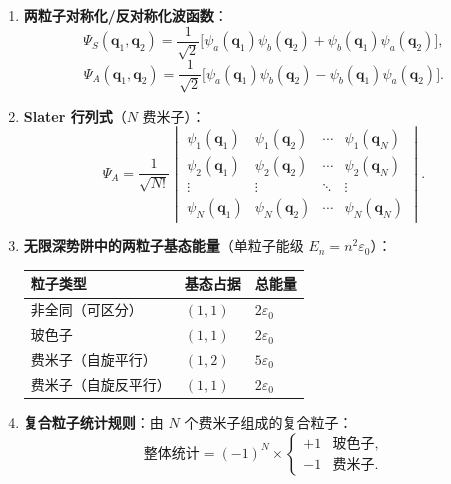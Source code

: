 \begin{formulabox}[核心公式]
\begin{enumerate}[label=\textbf{(\arabic*)}]
    \item \textbf{两粒子对称化/反对称化波函数}：
    \[
    \Psi_S(\mathbf{q}_1,\mathbf{q}_2)=\frac{1}{\sqrt{2}}\bigl[\psi_a(\mathbf{q}_1)\psi_b(\mathbf{q}_2)+\psi_b(\mathbf{q}_1)\psi_a(\mathbf{q}_2)\bigr],
    \]
    \[
    \Psi_A(\mathbf{q}_1,\mathbf{q}_2)=\frac{1}{\sqrt{2}}\bigl[\psi_a(\mathbf{q}_1)\psi_b(\mathbf{q}_2)-\psi_b(\mathbf{q}_1)\psi_a(\mathbf{q}_2)\bigr].
    \]

    \item \textbf{Slater 行列式}（$N$ 费米子）：
    \[
    \Psi_A=\frac{1}{\sqrt{N!}}
    \begin{vmatrix}
    \psi_1(\mathbf{q}_1)&\psi_1(\mathbf{q}_2)&\cdots&\psi_1(\mathbf{q}_N)\\
    \psi_2(\mathbf{q}_1)&\psi_2(\mathbf{q}_2)&\cdots&\psi_2(\mathbf{q}_N)\\
    \vdots&\vdots&\ddots&\vdots\\
    \psi_N(\mathbf{q}_1)&\psi_N(\mathbf{q}_2)&\cdots&\psi_N(\mathbf{q}_N)
    \end{vmatrix}.
    \]

    \item \textbf{无限深势阱中的两粒子基态能量}（单粒子能级 $E_n=n^2\varepsilon_0$）：
    \begin{center}
    \begin{tabular}{lll}
    \toprule
    \textbf{粒子类型} & \textbf{基态占据} & \textbf{总能量} \\
    \midrule
    非全同（可区分） & $(1,1)$ & $2\varepsilon_0$ \\
    玻色子 & $(1,1)$ & $2\varepsilon_0$ \\
    费米子（自旋平行） & $(1,2)$ & $5\varepsilon_0$ \\
    费米子（自旋反平行） & $(1,1)$ & $2\varepsilon_0$ \\
    \bottomrule
    \end{tabular}
    \end{center}

    \item \textbf{复合粒子统计规则}：由 $N$ 个费米子组成的复合粒子：
    \[
    \text{整体统计}=(-1)^N\times\begin{cases}+1&\text{玻色子},\\-1&\text{费米子}.\end{cases}
    \]


\end{enumerate}
\end{formulabox}
